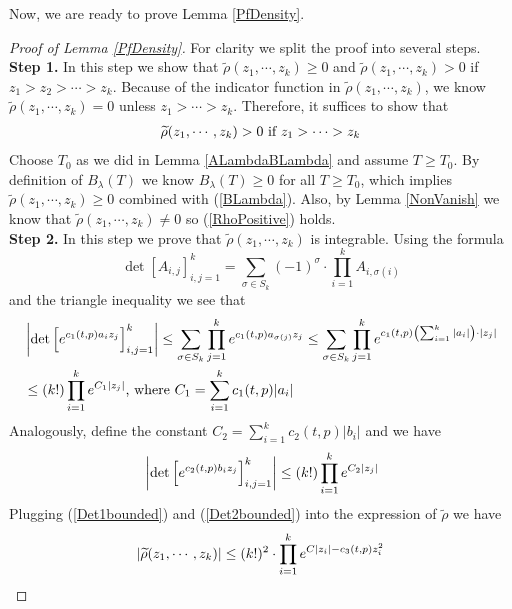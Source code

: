 Now, we are ready to prove Lemma \ref{PfDensity}.
\begin{proof}[Proof of Lemma \ref{PfDensity}] For clarity we split the proof into several steps.\\
\textbf{Step 1. }In this step we show that $\widetilde{\rho}(z_1,\cdots,z_{k})\geq 0$ and $\widetilde{\rho}(z_1,\cdots,z_k)>0$ if $z_1>z_2>\cdots>z_k$. Because of the indicator function in $\widetilde{\rho}(z_1,\cdots,z_k)$, we know $\widetilde{\rho}(z_1,\cdots,z_{k})=0$ unless $z_1>\cdots>z_k$. Therefore, it suffices to show that 
\begin{align}{\label{RhoPositive}}
\widetilde{\rho}(z_1,\cdots,z_k)>0 \text{ if } z_{1}>\cdots>z_k	
\end{align}
Choose $T_{0}$ as we did in Lemma \ref{ALambdaBLambda} and assume $T\geq T_{0}$. By definition of $B_{\lambda}(T)$ we know $B_{\lambda}(T)\geq 0$ for all $T\geq T_{0}$, which implies $\widetilde{\rho}(z_1,\cdots,z_k)\geq 0$ combined with (\ref{BLambda}). Also, by Lemma \ref{NonVanish} we know that $\widetilde{\rho}(z_1,\cdots,z_{k})\neq 0$ so (\ref{RhoPositive}) holds.\\
\textbf{Step 2.} In this step we prove that $\widetilde{\rho}(z_1,\cdots,z_k)$ is integrable. Using the formula $$\det\left[A_{i,j}\right]_{i,j=1}^{k}=\sum_{\sigma\in S_{k}}(-1)^{\sigma}\cdot\prod_{i=1}^{k}A_{i,\sigma(i)}$$ and the triangle inequality we see that 
\begin{equation}{\label{Det1bounded}}
	\begin{split}
		& \left|\det\left[e^{c_1(t,p)a_i z_j}\right]_{i,j=1}^{k}\right|\leq\sum_{\sigma\in S_k}\prod_{j=1}^{k}e^{c_1(t,p)a_{\sigma(j)}z_{j}}\leq \sum_{\sigma\in S_k}\prod_{j=1}^{k}e^{c_1(t,p)\left(\sum_{i=1}^{k}|a_i|\right)\cdot|z_j|}\\
		& \leq (k!)\prod_{i=1}^{k}e^{C_1|z_j|}\text{, where $C_{1}=\sum_{i=1}^{k}c_1(t,p)|a_i|$}
	\end{split}
\end{equation}
Analogously, define the constant $C_2=\sum_{i=1}^{k}c_2(t,p)|b_i|$ and we have
\begin{equation}{\label{Det2bounded}}
	\left|\det\left[e^{c_2(t,p)b_i z_j}\right]_{i,j=1}^{k}\right|\leq (k!)\prod_{i=1}^{k}e^{C_{2}|z_{j}|}
\end{equation} 
Plugging (\ref{Det1bounded}) and (\ref{Det2bounded}) into the expression of $\widetilde{\rho}$ we have 
\begin{align}{\label{Dominate}}
	|\widetilde{\rho}(z_1,\cdots,z_k)|\leq (k!)^2\cdot\prod_{i=1}^{k}e^{C|z_i|-c_3(t,p)z_i^2}

\end{align}
\end{proof}
